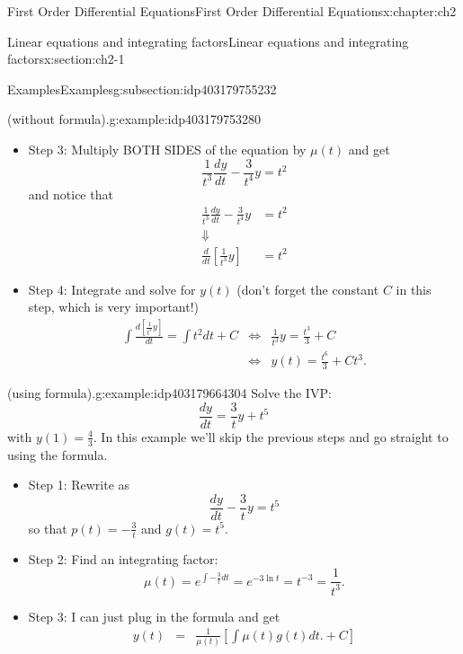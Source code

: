 \documentclass[oneside,10pt,]{book}
\numberwithin{equation}{section}
\numberwithin{equation}{section}
\newcommand{\amp}{&}
\begin{document}
\begin{chapterptx}{First Order Differential Equations}{}{First Order Differential Equations}{}{}{x:chapter:ch2}
\begin{sectionptx}{Linear equations and integrating factors}{}{Linear equations and integrating factors}{}{}{x:section:ch2-1}
\begin{subsectionptx}{Examples}{}{Examples}{}{}{g:subsection:idp403179755232}
\begin{example}{(without formula).}{g:example:idp403179753280}
\begin{itemize}[label=\textbullet]
Note we only need an integrating factor, not a general integrating factor. So we never need to have a \(+C\) in this step! In the next step we will note that we also don't need the absolute value inside the natural log (why not?).%
\item{}Step 3: Multiply BOTH SIDES of the equation by \(\mu(t)\) and get%
\begin{equation*}
\frac{1}{t^{3}}\frac{dy}{dt}-\frac{3}{t^{4}}y=t^{2}
\end{equation*}
and notice that%
\begin{align*}
\frac{1}{t^{3}}\frac{dy}{dt}-\frac{3}{t^{4}}y \amp =t^{2}\\
\Downarrow\\
\frac{d}{dt} \left[\frac{1}{t^{3}}y\right]\amp =t^{2}
\end{align*}
%
\item{}Step 4: Integrate and solve for \(y(t)\) (don't forget the constant \(C\) in this step, which is very important!)%
\begin{align*}
\int\frac{d\left[\frac{1}{t^{3}}y\right]}{dt}=\int t^{2}dt+C \amp \iff \amp \frac{1}{t^{3}}y=\frac{t^{3}}{3}+C\\
\amp \iff \amp y(t)=\frac{t^{6}}{3}+Ct^{3}.
\end{align*}
%
\end{itemize}
\end{example}
\begin{example}{(using formula).}{g:example:idp403179664304}%
Solve the IVP:%
\begin{equation*}
\frac{dy}{dt}=\frac{3}{t}y+t^{5}
\end{equation*}
with \(y(1)=\frac{4}{3}\). In this example we'll skip the previous steps and go straight to using the formula.%
%
\begin{itemize}[label=\textbullet]
\item{}Step 1: Rewrite as%
\begin{equation*}
\frac{dy}{dt}-\frac{3}{t}y=t^{5}
\end{equation*}
so that \(p(t)=-\frac{3}{t}\) and \(g(t)=t^{5}\).%
\item{}Step 2: Find an integrating factor:%
\begin{equation*}
\mu(t)=e^{\int-\frac{3}{t}dt}=e^{-3\ln t}=t^{-3}=\frac{1}{t^{3}}.
\end{equation*}
%
\item{}Step 3: I can just plug in the formula and get%
\begin{align*}
y(t) \amp = \amp \frac{1}{\mu(t)}\left[\int\mu(t)g(t)dt.+C\right]\\

\end{align*}
\end{itemize}
\end{example}
\end{subsectionptx}
\end{sectionptx}
\end{chapterptx}
\end{document}
